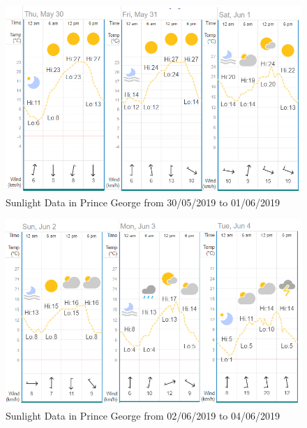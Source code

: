 \begin{figure}[h]
  \begin{center}
  \includegraphics[scale=.90]{images/figure96.png}
  \end{center}
  \caption{Sunlight Data in Prince George from 30/05/2019 to 01/06/2019 } %
\label{sun}

\end{figure}


\begin{figure}[h]
  \begin{center}
  \includegraphics[scale=.90]{images/figure97.png}
  \end{center}
  \caption{Sunlight Data in Prince George from 02/06/2019 to 04/06/2019 } %
  \label{sun1}

\end{figure}
